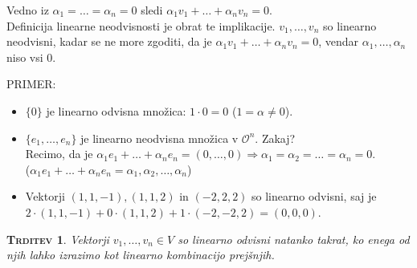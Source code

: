 \documentclass[a4paper,12pt]{article}
\newtheorem*{trditev}{\textsc{Trditev}}
\begin{document}
\noindent Vedno iz $\alpha_1=\ldots=\alpha_n=0$ sledi $\alpha_1v_1+\ldots+\alpha_nv_n=0$. \\

\noindent Definicija linearne neodvisnosti je obrat te implikacije. $v_1,\ldots,v_n$ so linearno neodvisni, kadar se ne more zgoditi, da je $\alpha_1v_1+\ldots+\alpha_nv_n=0$, vendar $\alpha_1,\ldots,\alpha_n$ niso vsi 0. \\

\newpage 

\noindent PRIMER:
\begin{itemize}
\item $\{0\}$ je linearno odvisna množica: $1\cdot 0=0$ ($1=\alpha\neq0$).
\item $\{e_1,\ldots,e_n\}$ je linearno neodvisna množica v $\mathcal{O} ^n$. Zakaj? \\

Recimo, da je $\alpha_1e_1+\ldots+\alpha_ne_n=(0,\ldots,0) \Rightarrow \alpha_1=\alpha_2=\ldots=\alpha_n=0$. \\

($\alpha_1e_1+\ldots+\alpha_ne_n=\alpha_1,\alpha_2,\ldots,\alpha_n$)

\item Vektorji $(1,1,-1),(1,1,2)$ in $(-2,2,2)$ so linearno odvisni, saj je \linebreak $2\cdot(1,1,-1) + 0\cdot(1,1,2)+1\cdot(-2,-2,2)=(0,0,0)$. \\
\end{itemize}

\begin{trditev}
Vektorji $v_1,\ldots,v_n\in V$ so linearno odvisni natanko takrat, ko enega od njih lahko izrazimo kot linearno kombinacijo prejšnjih. \\
\end{trditev}
\end{document}
